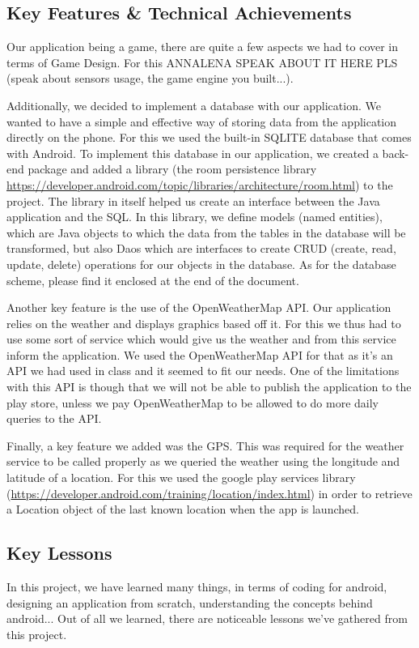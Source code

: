 \documentclass{sigchi}
\begin{document}
\subsection{Key Features \& Technical Achievements}
Our application being a game, there are quite a few aspects we had to cover in terms of Game Design. For this ANNALENA SPEAK ABOUT IT HERE PLS (speak about sensors usage, the game engine you built...). 

Additionally, we decided to implement a database with our application. We wanted to have a simple and effective way of storing data from the application directly on the phone. For this we used the built-in SQLITE database that comes with Android. To implement this database in our application, we created a back-end package and added a library (the room persistence library \url{https://developer.android.com/topic/libraries/architecture/room.html}) to the project. The library in itself helped us create an interface between the Java application and the SQL. In this library, we define models (named entities), which are Java objects to which the data from the tables in the database will be transformed, but also Daos which are interfaces to create CRUD (create, read, update, delete) operations for our objects in the database. As for the database scheme, please find it enclosed at the end of the document.

Another key feature is the use of the OpenWeatherMap API. Our application relies on the weather and displays graphics based off it. For this we thus had to use some sort of service which would give us the weather and from this service inform the application. We used the OpenWeatherMap API for that as it's an API we had used in class and it seemed to fit our needs. One of the limitations with this API is though that we will not be able to publish the application to the play store, unless we pay OpenWeatherMap to be allowed to do more daily queries to the API. 

Finally, a key feature we added was the GPS. This was required for the weather service to be called properly as we queried the weather using the longitude and latitude of a location. For this we used the google play services library (\url{https://developer.android.com/training/location/index.html}) in order to retrieve a Location object of the last known location when the app is launched. 

\subsection{Key Lessons}
In this project, we have learned many things, in terms of coding for android, designing an application from scratch, understanding the concepts behind android... Out of all we learned, there are noticeable lessons we've gathered from this project. 
\end{document}
